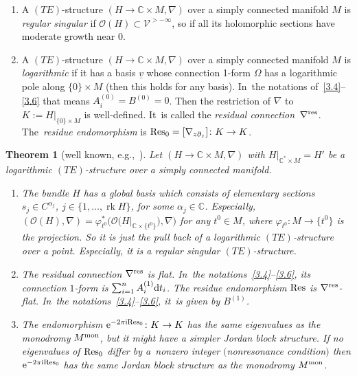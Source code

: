 \documentclass[10pt,a4paper]{amsart}
\numberwithin{equation}{section}
\numberwithin{figure}{section}
\newcommand{\C}{{\mathbb C}}
\newcommand{\OO}{{\mathcal O}}
\newcommand{\VV}{{\mathcal V}}
\newcommand{\ddd}{{\rm d}}
\newcommand{\uuuu}{\underline}
\newcommand{\paa}{\partial}
\newcommand{\nnn}{\nabla}
\DeclareMathOperator{\rk}{rk}
\newtheorem{Theorem}{Theorem}[section]
\begin{document}
\begin{Definition}\qquad%
\begin{enumerate}\itemsep=0pt
\item[$(a)$] A $(TE)$-structure $(H\to\C\times M ,\nnn)$
over a simply connected manifold $M$ is
{\it regular singular} if $\OO(H)\subset \VV^{>-\infty}$,
so if all its holomorphic sections have moderate growth
near 0.

\item[$(b)$] A $(TE)$-structure $(H\to\C\times M ,\nnn)$
over a simply connected manifold $M$ is {\it logarithmic} if
it has a basis $\uuuu{v}$ whose connection 1-form
$\Omega$ has a logarithmic pole along $\{0\}\times M$
(then this holds for any basis). In~the notations of~\eqref{3.4}--\eqref{3.6} that means
$A_i^{(0)}=B^{(0)}=0$.
Then the restriction of $\nnn$ to $K:=H|_{\{0\}\times M}$
is well-defined. It~is called the {\it residual connection}~$\nnn^{\rm res}$. The~{\it residue endomorphism} is
${\rm Res}_0=[\nnn_{z\paa_z}]\colon K\to K$.
\end{enumerate}
\end{Definition}


\begin{Theorem}[{well known, e.g.,~\cite[Theorems 7.10 and~8.7]{He02}}]\label{t3.23}
Let $(H\to\C\times M,\nnn)$ with $H|_{\C^*\times M}=H'$
be a logarithmic $(TE)$-structure over a simply
connected manifold.
\begin{enumerate}\itemsep=0pt
\item[$(a)$] The bundle $H$ has a global basis which consists of
elementary sections $s_j\in C^{\alpha_j}$,
$j\in\{1,\dots ,\rk H\}$, for some $\alpha_j\in\C$.
Especially, $(\OO(H),\nnn)=\varphi_{t^0}^*
\big(\OO\big(H|_{\C\times\{t^0\}}\big),\nnn\big)$
for any $t^0\in M$, where $\varphi_{t^0}\colon M\to\big\{t^0\big\}$
is the projection. So it is just the pull back of
a logarithmic $(TE)$-structure over a point.
Especially, it is a regular singular $(TE)$-structure.

\item[$(b)$] The residual connection $\nnn^{\rm res}$ is flat. In~the notations~\eqref{3.4}--\eqref{3.6}, its
connection $1$-form is $\sum_{i=1}^n A_i^{(1)}\ddd t_i$.
The residue endomorphism ${\rm Res}$ is $\nnn^{\rm res}$-flat. In~the notations~\eqref{3.4}--\eqref{3.6}, it~is given
by $B^{(1)}$.

\item[$(c)$] The endomorphism ${\rm e}^{-2\pi {\rm i}{\rm Res}_0}\colon K\to K$
has the same eigenvalues as the monodromy $M^{\rm mon}$,
but it might have a simpler Jordan block structure.
If no eigenvalues of ${\rm Res}_0$
differ by a~nonzero integer
$($nonresonance condition$)$ then ${\rm e}^{-2\pi {\rm i}{\rm Res}_0}$
has the same Jordan block structure as the mono\-dromy $M^{\rm mon}$.
\end{enumerate}
\end{Theorem}
\end{document}

